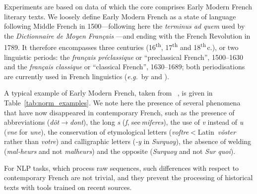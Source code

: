 Experiments are based on data of which the core comprises Early Modern French literary texts. We loosely define Early Modern French as a state of language following Middle French in 1500---following here the \emph{terminus ad quem} used by the \emph{Dictionnaire de Moyen Français} \cite{martin-2020-dictionnaire}---and ending with the French Revolution in 1789. It therefore encompasses three centuries (16\textsuperscript{th}, 17\textsuperscript{th} and 18\textsuperscript{th}\,c.), or two linguistic periods: the \emph{français préclassique} or ``preclassical French'', 1500--1630 and the \emph{français classique} or ``classical French'', 1630--1689; both periodisations are currently used in French linguistics (\emph{e.g.}~by  and ).

A typical example of Early Modern French, taken from ~, is given in Table~\ref{tab:norm_examples}. We note here the presence of several phenomena that have now disappeared in contemporary French, such as the presence of abbreviations (\emph{dõt}$\to$\emph{dont}), the long \emph{s} (\emph{ſ}, see\,\emph{miſeres}), the use of \emph{v} instead of \emph{u} (\emph{vne} for \emph{une}), the conservation of etymological letters (\emph{voſtre}$<$Latin~\emph{vŏster} rather than \emph{votre}) and calligraphic letters (\emph{-y} in \emph{Surquoy}), the absence of welding  (\emph{\mbox{mal-heurs}} and not \emph{malheurs}) and the opposite (\emph{Surquoy} and not \emph{Sur quoi}).

For NLP tasks, which process raw sequences, such differences with respect to contemporary French are not trivial, and they prevent the processing of historical texts with tools trained on recent sources.

\subsection{\texorpdfstring{\freemmax}{FREEM max}}\label{freem_max}

